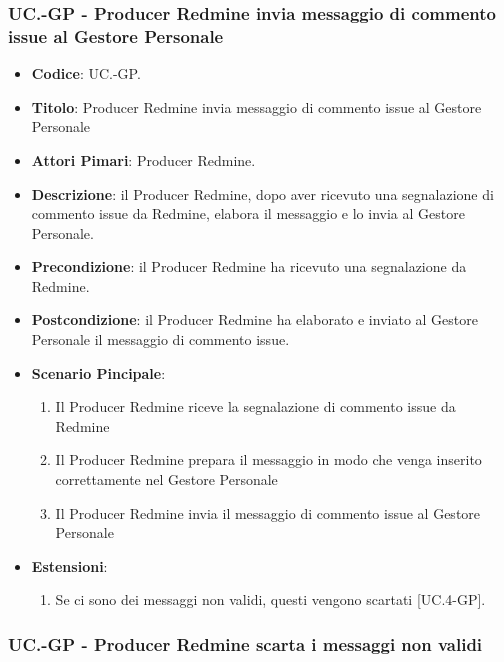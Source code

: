 	\subsubsection{UC\theuccount.\thesubuccount-GP - Producer Redmine invia messaggio di commento issue al Gestore Personale}
	\begin{itemize}
		\item \textbf{Codice}: UC\theuccount.\thesubuccount-GP.
		\item \textbf{Titolo}: Producer Redmine invia messaggio di commento issue al Gestore Personale
		\item \textbf{Attori Pimari}: Producer Redmine.
		\item \textbf{Descrizione}: il Producer Redmine, dopo aver ricevuto una segnalazione di commento issue da Redmine, elabora il messaggio e lo invia al Gestore Personale.
		\item \textbf{Precondizione}: il Producer Redmine ha ricevuto una segnalazione da Redmine.
		\item \textbf{Postcondizione}: il Producer Redmine ha elaborato e inviato al Gestore Personale il messaggio di commento issue.
		\item \textbf{Scenario Pincipale}: 
		\begin{enumerate}
			\item Il Producer Redmine riceve la segnalazione di commento issue da Redmine
			\item Il Producer Redmine prepara il messaggio in modo che venga inserito correttamente nel Gestore Personale
			\item Il Producer Redmine invia il messaggio di	commento issue al Gestore Personale
		\end{enumerate}
		\item \textbf{Estensioni}: 
		\begin{enumerate}
			\item Se ci sono dei messaggi non validi, questi vengono scartati [UC\theuccount.4-GP].
		\end{enumerate}
	\end{itemize}
	
	\subsubsection{UC\theuccount.\thesubuccount-GP - Producer Redmine scarta i messaggi non validi}
	

